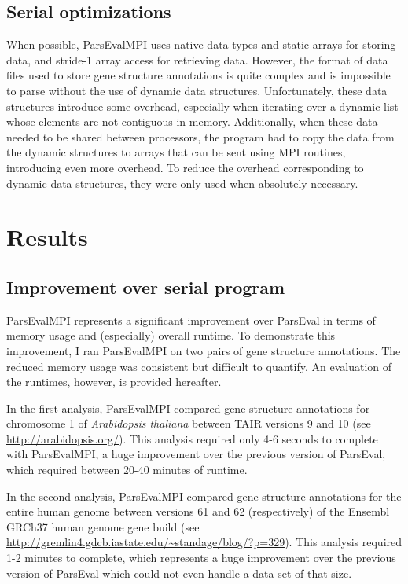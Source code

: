 \documentclass{bioinfo}
\begin{document}
\begin{methods}
\subsection*{Serial optimizations}
When possible, ParsEvalMPI uses native data types and static arrays for storing data, and stride-1 array access for retrieving data. However, the format of data files used to store gene structure annotations is quite complex and is impossible to parse without the use of dynamic data structures. Unfortunately, these data structures introduce some overhead, especially when iterating over a dynamic list whose elements are not contiguous in memory. Additionally, when these data needed to be shared between processors, the program had to copy the data from the dynamic structures to arrays that can be sent using MPI routines, introducing even more overhead. To reduce the overhead corresponding to dynamic data structures, they were only used when absolutely necessary.

\end{methods}

\section*{Results} 
\subsection*{Improvement over serial program}
ParsEvalMPI represents a significant improvement over ParsEval in terms of memory usage and (especially) overall runtime. To demonstrate this improvement, I ran ParsEvalMPI on two pairs of gene structure annotations. The reduced memory usage was consistent but difficult to quantify. An evaluation of the runtimes, however, is provided hereafter.

In the first analysis, ParsEvalMPI compared gene structure annotations for chromosome 1 of \textit{Arabidopsis thaliana} between TAIR versions 9 and 10 (see \url{http://arabidopsis.org/}). This analysis required only 4-6 seconds to complete with ParsEvalMPI, a huge improvement over the previous version of ParsEval, which required between 20-40 minutes of runtime.

In the second analysis, ParsEvalMPI compared gene structure annotations for the entire human genome between versions 61 and 62 (respectively) of the Ensembl GRCh37 human genome gene build (see \url{http://gremlin4.gdcb.iastate.edu/~standage/blog/?p=329}). This analysis required 1-2 minutes to complete, which represents a huge improvement over the previous version of ParsEval which could not even handle a data set of that size.
\end{document}
